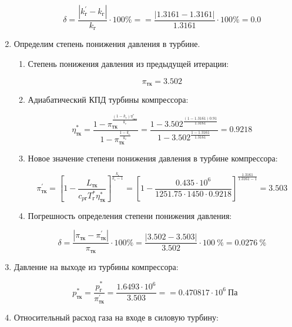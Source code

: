 \documentclass[a4paper,10pt]{article}
\begin{document}
\begin{enumerate}
\begin{enumerate}
		\[
		\delta = \frac{ \left| k_{г}^\prime - k_{г} \right| }{ k_{г} } \cdot 100 \% =
				= \frac{ \left| 1.3161 - 1.3161 \right| }{ 1.3161 } \cdot 100 \%
				= 0.0
		\]
	
	\end{enumerate}
	
	\item Определим степень понижения давления в турбине.
	
	\begin{enumerate}
		
		\item Степень понижения давления из предыдущей итерации:
		
		\[
		\pi_{тк} = 3.502
		\]
		
		\item Адиабатический КПД турбины компрессора:
		
		\[
		\eta_{тк}^* = \frac{1 - \pi_{тк} ^ 
	                   {\frac{\left(1 - k_г \right) \eta_{ткп}^*}{k_г}}
					}{
					   1 - \pi_{тк} ^ {\frac{1 - k_г}{k_г}} 
					} = 
				\frac{1 - 3.502 ^ 
	                   {\frac{\left(1 - 1.3161 \right) 0.91 }{ 1.3161 }}
					}{
					   1 - 3.502 ^ {\frac{ 1 - 1.3161 }{ 1.3161 }} 
					} = 
			0.9218
		\]	
		
		\item Новое значение степени понижения давления в турбине компрессора:
		
		\[
		\pi_{тк}^\prime = \left[ 
							1 - \frac{L_{тк}}{c_{pг} T_г^* \eta_{тк}^*}	
						\right] ^ 
							\frac{k_г}{k_г - 1} =
					\left[ 
						1 - \frac{ 
								0.435 \cdot 10^6  
							}{ 
								1251.75 \cdot 1450 \cdot 0.9218
							}	
					\right] ^ 
						\frac{ 1.3161 }{ 1.3161 - 1} =
					3.503
		\]
		
		\item Погрешность определения степени понижения давления:
		
		\[
		\delta = \frac{ \left| \pi_{тк} - \pi_{тк}^\prime \right| }{ \pi_{тк} } \cdot 100 \% =
				\frac{ 
					\left| 3.502 - 3.503 \right|
				}{ 
					3.502 
				} \cdot 100\ \% = 
				0.0276\ \% 
		\]
	
	\end{enumerate}
	
	\item Давление на выходе из турбины компрессора:
	
	\[
	p_{тк}^* = \frac{ p_г^* }{ \pi_{тк}^\prime } = \frac{ 1.6493 \cdot 10^6 }{ 3.503 } = 
		= 0.470817 \cdot 10^6\ Па
	\]
	
	\item Относительный расход газа на входе в силовую турбину:
	

\end{enumerate}
\end{document}
